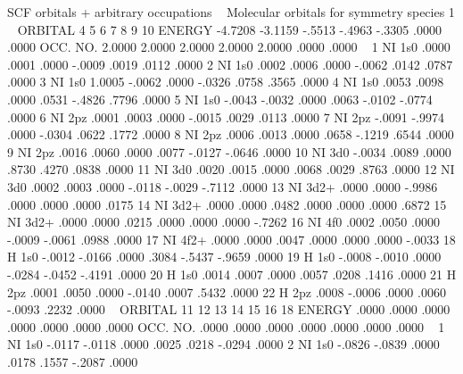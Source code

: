 \begin{sourcelisting}
   SCF orbitals + arbitrary occupations
~
   Molecular orbitals for symmetry species 1 
~
   ORBITAL        4         5         6         7         8         9        10
   ENERGY     -4.7208   -3.1159    -.5513    -.4963    -.3305     .0000     .0000
   OCC. NO.    2.0000    2.0000    2.0000    2.0000    2.0000     .0000     .0000
~
 1 NI  1s0      .0000     .0001     .0000    -.0009     .0019     .0112     .0000
 2 NI  1s0      .0002     .0006     .0000    -.0062     .0142     .0787     .0000
 3 NI  1s0     1.0005    -.0062     .0000    -.0326     .0758     .3565     .0000
 4 NI  1s0      .0053     .0098     .0000     .0531    -.4826     .7796     .0000
 5 NI  1s0     -.0043    -.0032     .0000     .0063    -.0102    -.0774     .0000
 6 NI  2pz      .0001     .0003     .0000    -.0015     .0029     .0113     .0000
 7 NI  2pz     -.0091    -.9974     .0000    -.0304     .0622     .1772     .0000
 8 NI  2pz      .0006     .0013     .0000     .0658    -.1219     .6544     .0000
 9 NI  2pz      .0016     .0060     .0000     .0077    -.0127    -.0646     .0000
10 NI  3d0     -.0034     .0089     .0000     .8730     .4270     .0838     .0000
11 NI  3d0      .0020     .0015     .0000     .0068     .0029     .8763     .0000
12 NI  3d0      .0002     .0003     .0000    -.0118    -.0029    -.7112     .0000
13 NI  3d2+     .0000     .0000    -.9986     .0000     .0000     .0000     .0175
14 NI  3d2+     .0000     .0000     .0482     .0000     .0000     .0000     .6872
15 NI  3d2+     .0000     .0000     .0215     .0000     .0000     .0000    -.7262
16 NI  4f0      .0002     .0050     .0000    -.0009    -.0061     .0988     .0000
17 NI  4f2+     .0000     .0000     .0047     .0000     .0000     .0000    -.0033
18 H   1s0     -.0012    -.0166     .0000     .3084    -.5437    -.9659     .0000
19 H   1s0     -.0008    -.0010     .0000    -.0284    -.0452    -.4191     .0000
20 H   1s0      .0014     .0007     .0000     .0057     .0208     .1416     .0000
21 H   2pz      .0001     .0050     .0000    -.0140     .0007     .5432     .0000
22 H   2pz      .0008    -.0006     .0000     .0060    -.0093     .2232     .0000
~
   ORBITAL       11        12        13        14        15        16        18     
   ENERGY       .0000     .0000     .0000     .0000     .0000     .0000     .0000  
   OCC. NO.     .0000     .0000     .0000     .0000     .0000     .0000     .0000 
~
 1 NI  1s0     -.0117    -.0118     .0000     .0025     .0218    -.0294     .0000 
 2 NI  1s0     -.0826    -.0839     .0000     .0178     .1557    -.2087     .0000 

\end{sourcelisting}

